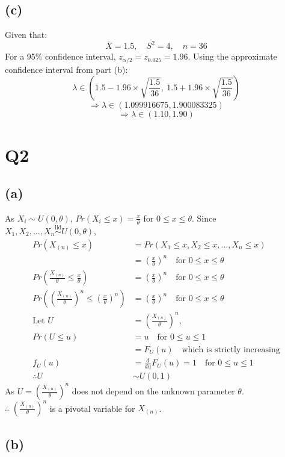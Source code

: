 \documentclass{article}
\begin{document}
\subsection*{(c)}

Given that:
\[
\overline{X} = 1.5, \quad S^2 = 4, \quad n = 36
\]
For a 95\% confidence interval, \( z_{\alpha/2} = z_{0.025} = 1.96 \). Using the approximate confidence interval from part (b):
\[
\lambda \in \left(1.5 - 1.96 \times \sqrt{\frac{1.5}{36}}, \ 1.5 + 1.96 \times \sqrt{\frac{1.5}{36}}\right)
\]
\[
\Rightarrow \lambda \in \left(1.099916675, 1.900083325\right)
\]
\[
\Rightarrow \lambda \in \left(1.10, 1.90\right)
\]

\section*{Q2}

\subsection*{(a)}

As $X_i \sim U(0, \theta)$, $Pr(X_i \leq x) = \frac{x}{\theta}$ for $0 \leq x \leq \theta$. Since $X_1,X_2,\ldots,X_n \overset{\text{iid}}{\sim} U(0, \theta)$,
\begin{align*}
Pr(X_{(n)} \leq x) &= Pr(X_1 \leq x, X_2 \leq x, \ldots, X_n \leq x) \\
&= (\frac{x}{\theta})^n \quad \text{for } 0 \leq x \leq \theta \\
Pr(\frac{X_{(n)}}{\theta} \leq \frac{x}{\theta}) &= (\frac{x}{\theta})^n \quad \text{for } 0 \leq x \leq \theta \\
Pr((\frac{X_{(n)}}{\theta})^n \leq (\frac{x}{\theta})^n) &= (\frac{x}{\theta})^n \quad \text{for } 0 \leq x \leq \theta \\
\text{Let } U &= (\frac{X_{(n)}}{\theta})^n, \\
Pr(U \leq u) &= u \quad \text{for } 0 \leq u \leq 1 \\
&= F_U(u) \quad \text{which is strictly increasing} \\
f_U(u) &= \frac{d}{du} F_U(u) = 1 \quad \text{for } 0 \leq u \leq 1 \\
\therefore U &\sim U(0, 1)
\end{align*}
As $U = (\frac{X_{(n)}}{\theta})^n$ does not depend on the unknown parameter $\theta$. \\
$\therefore$ $(\frac{X_{(n)}}{\theta})^n$ is a pivotal variable for $X_{(n)}$.

\subsection*{(b)}
\end{document}
